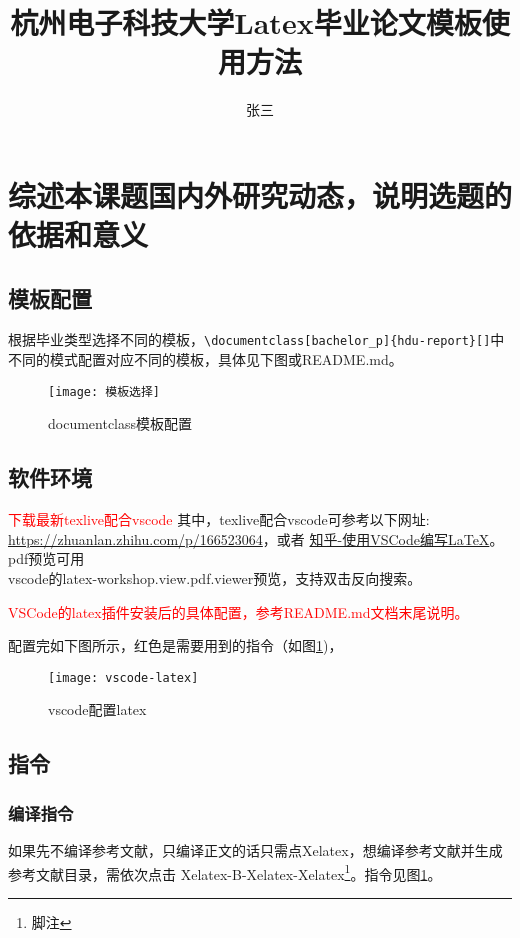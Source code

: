 \documentclass[course_p]{hdu-report}
\title{杭州电子科技大学Latex毕业论文模板使用方法}{Munual of latex on thesis for HDU}%
\author{张三}{San Zhang}%
\begin{document}
\makecover


\section{综述本课题国内外研究动态，说明选题的依据和意义}
\subsection{模板配置}
根据毕业类型选择不同的模板，\verb+\documentclass[bachelor_p]{hdu-report}[]+中不同的模式配置对应不同的模板，具体见下图或README.md。
 \begin{figure}[!htb]
  \centering
  \texttt{[image: 模板选择]}
  \caption{documentclass模板配置}
\end{figure}
\subsection{软件环境}
\textcolor{red}{下载最新texlive配合vscode}
其中，texlive配合vscode可参考以下网址:\\
\url{https://zhuanlan.zhihu.com/p/166523064}，或者 \href{https://zhuanlan.zhihu.com/p/38178015}{知乎-使用VSCode编写LaTeX}。
pdf预览可用\\
vscode的latex-workshop.view.pdf.viewer预览，支持双击反向搜索。

\textcolor{red}{VSCode的latex插件安装后的具体配置，参考README.md文档末尾说明。}

配置完如下图所示，红色是需要用到的指令（如图\ref{fig_vs_latex})，
 \begin{figure}[!htb]
  \centering
  \texttt{[image: vscode-latex]}
  \caption{vscode配置latex}
  \label{fig_vs_latex}
\end{figure}

\subsection{指令}
\subsubsection{编译指令}
如果先不编译参考文献，只编译正文的话只需点Xelatex，想编译参考文献并生成参考文献目录，需依次点击 Xelatex-B-Xelatex-Xelatex\footnote{脚注}。指令见图\ref{fig_vs_latex}。

\end{document}
